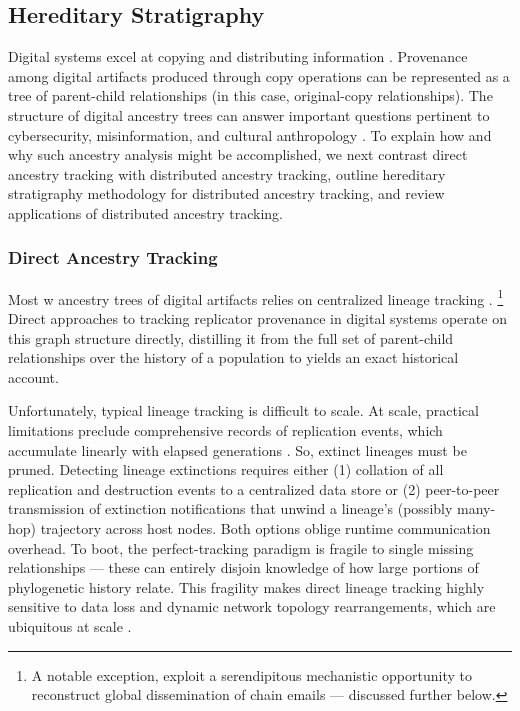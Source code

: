 \subsection{Hereditary Stratigraphy} \label{sec:hereditary-stratigraphy}

Digital systems excel at copying and distributing information \citep{miller2001taking}.
Provenance among digital artifacts produced through copy operations can be represented as a tree of parent-child relationships (in this case, original-copy relationships).
The structure of digital ancestry trees can answer important questions pertinent to cybersecurity, misinformation, and cultural anthropology \citep{aslan2020comprehensive,dupuis2019spread,ling2021dissecting}.
To explain how and why such ancestry analysis might be accomplished, we next contrast direct ancestry tracking with distributed ancestry tracking, outline hereditary stratigraphy methodology for distributed ancestry tracking, and review applications of distributed ancestry tracking.

\subsubsection{Direct Ancestry Tracking}

Most w ancestry trees of digital artifacts relies on centralized lineage tracking \citep{friggeri2014rumor,cohen1987computer,dolson2023phylotrackpy}.%
\footnote{A notable exception, \cite{libennowell2008tracing} exploit a serendipitous mechanistic opportunity to reconstruct global dissemination of chain emails --- discussed further below.}
Direct approaches to tracking replicator provenance in digital systems operate on this graph structure directly, distilling it from the full set of parent-child relationships over the history of a population to yields an exact historical account.

Unfortunately, typical lineage tracking is difficult to scale.
At scale, practical limitations preclude comprehensive records of replication events, which accumulate linearly with elapsed generations \citep{dolson2023algorithms}.
So, extinct lineages must be pruned.
Detecting lineage extinctions requires either (1) collation of all replication and destruction events to a centralized data store or (2) peer-to-peer transmission of extinction notifications that unwind a lineage's (possibly many-hop) trajectory across host nodes.
Both options oblige runtime communication overhead.
To boot, the perfect-tracking paradigm is fragile to single missing relationships --- these can entirely disjoin knowledge of how large portions of phylogenetic history relate.
This fragility makes direct lineage tracking highly sensitive to data loss and dynamic network topology rearrangements, which are ubiquitous at scale \citep{cappello2014toward,ackley2011pursue}.


